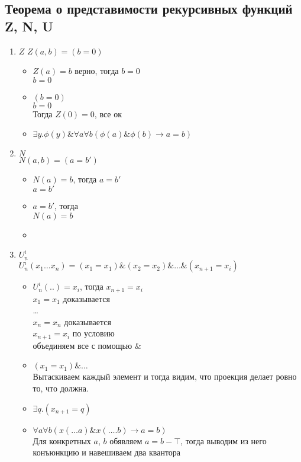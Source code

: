 \subsection{Теорема о представимости рекурсивных функций Z, N, U}
\label{sec-11-4}
\begin{enumerate}
\item $Z$
$Z(a, b) = (b = 0)$
\begin{itemize}
\item $Z(a) = b$ верно, тогда $b = 0$\\
$b = 0$
\item $(b = 0)$\\
$b = 0$\\
Тогда $Z(0) = 0$, все ок
\item $\exists y.\phi(y) \& \forall a\forall b(\phi(a) \& \phi(b) \to a = b)$\\
\end{itemize}
\item $N$\\
$N(a, b) = (a = b')$
\begin{itemize}
\item $N(a) = b$, тогда $a = b'$\\
$a = b'$
\item $a = b'$, тогда\\
$N(a) = b$
\item {}
\end{itemize}
\item $U_n^i$\\
$U_n^i(x_1 \dots x_n) = (x_1 = x_1) \& (x_2 = x_2) \& \dots  \& (x_{n+1} = x_i)$
\begin{itemize}
\item $U_n^i(..) = x_i$, тогда $x_{n+1} = x_i$\\
$x_1 = x_1$ доказывается\\
\dots\\
$x_n = x_n$ доказывается\\
$x_{n+1} = x_i$ по условию\\
объединяем все с помощью $\&$
\item $(x_1 = x_1) \& \dots$\\
Вытаскиваем каждый элемент и тогда видим, что
проекция делает ровно то, что должна.
\item $\exists q.(x_{n+1} = q)$\\
\item $\forall a\forall b(x(\dots a)\&x(\dots .b) \to a = b)$\\
Для конкретных $a$, $b$ обявляем $a = b - \top$, тогда выводим из него конъюнкцию и навешиваем два квантора
\end{itemize}
\end{enumerate}

